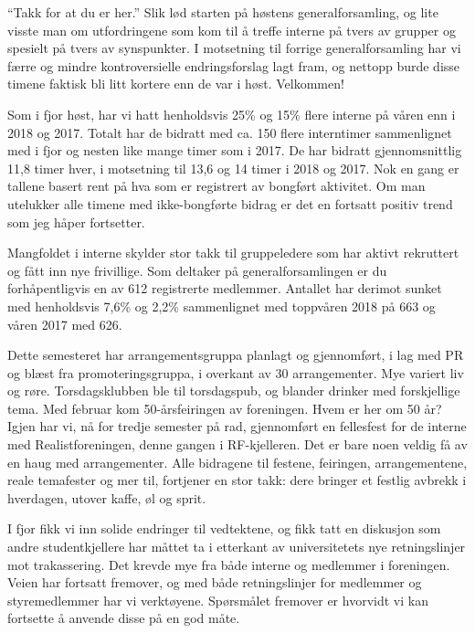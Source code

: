 \documentclass[10pt,norsk,a4paper]{article}
\begin{document}
\begin{multicols}{2}

``Takk for at du er her.'' Slik lød starten på høstens
generalforsamling, og lite visste man om utfordringene som kom til å
treffe interne på tvers av grupper og spesielt på tvers av synspunkter.
I motsetning til forrige generalforsamling har vi færre og mindre
kontroversielle endringsforslag lagt fram, og nettopp burde disse timene
faktisk bli litt kortere enn de var i høst. Velkommen!

Som i fjor høst, har vi hatt henholdsvis 25\% og 15\% flere interne på
våren enn i 2018 og 2017. Totalt har de bidratt med ca. 150 flere
interntimer sammenlignet med i fjor og nesten like mange timer som i
2017. De har bidratt gjennomsnittlig 11,8 timer hver, i motsetning til
13,6 og 14 timer i 2018 og 2017. Nok en gang er tallene basert rent på
hva som er registrert av bongført aktivitet. Om man utelukker alle
timene med ikke-bongførte bidrag er det en fortsatt positiv trend som
jeg håper fortsetter.


Mangfoldet i interne skylder stor takk til gruppeledere som har aktivt
rekruttert og fått inn nye frivillige. Som deltaker på
generalforsamlingen er du forhåpentligvis en av 612 registrerte
medlemmer. Antallet har derimot sunket med henholdsvis 7,6\% og 2,2\%
sammenlignet med toppvåren 2018 på 663 og våren 2017 med 626.


Dette semesteret har arrangementsgruppa planlagt og gjennomført, i lag
med PR og blæst fra promoteringsgruppa, i overkant av 30 arrangementer.
Mye variert liv og røre. Torsdagsklubben ble til torsdagspub, og blander
drinker med forskjellige tema. Med februar kom 50-årsfeiringen av
foreningen. Hvem er her om 50 år? Igjen har vi, nå for tredje semester
på rad, gjennomført en fellesfest for de interne med Realistforeningen,
denne gangen i RF-kjelleren. Det er bare noen veldig få av en haug med
arrangementer. Alle bidragene til festene, feiringen, arrangementene,
reale temafester og mer til, fortjener en stor takk: dere bringer et
festlig avbrekk i hverdagen, utover kaffe, øl og sprit.


I fjor fikk vi inn solide endringer til vedtektene, og fikk tatt en
diskusjon som andre studentkjellere har måttet ta i etterkant av
universitetets nye retningslinjer mot trakassering. Det krevde mye fra
både interne og medlemmer i foreningen. Veien har fortsatt fremover, og
med både retningslinjer for medlemmer og styremedlemmer har vi
verktøyene. Spørsmålet fremover er hvorvidt vi kan fortsette å anvende
disse på en god måte.



\end{multicols}
\end{document}
